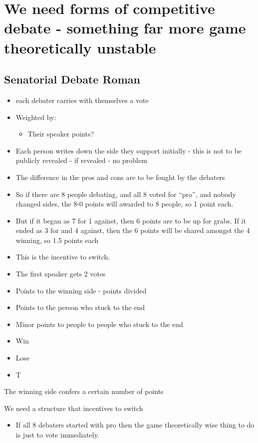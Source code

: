 \section{We need forms of competitive debate - something far more game theoretically unstable}

\subsection{Senatorial Debate Roman}

\begin{itemize}
    \item each debater carries with themselves a vote
    \item Weighted by:
    \begin{itemize}
        \item Their speaker points?
    \end{itemize}
    \item Each person writes down the side they support initially - this is not to be publicly revealed - if revealed - no problem
    \item The difference in the pros and cons are to be fought by the debaters
    \item So if there are 8 people debating, and all 8 voted for ``pro'', and nobody changed sides, the 8-0 points will awarded to 8 people, so 1 point each.
    \item But if it began as 7 for 1 against, then 6 points are to be up for grabs. If it ended as 3 for and 4 against, then the 6 points will be shared amongst the 4 winning, so 1.5 points each
    \item This is the incentive to switch.
    \item The first speaker gets 2 votes
    \item Points to the winning side - points divided
    \item Points to the person who stuck to the end
    \item Minor points to people to people who stuck to the end
    \item Win
    \item Lose
    \item T
\end{itemize}

The winning side confers a certain number of points

We need a structure that incentives to switch

\begin{itemize}
    \item If all 8 debaters started with pro then the game theoretically wise thing to do is just to vote immediately.
\end{itemize}

